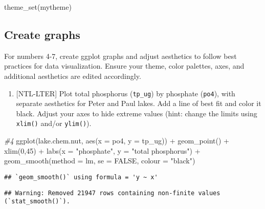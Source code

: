 \documentclass[
]{article}
\newenvironment{Shaded}{\begin{snugshade}}{\end{snugshade}}
\newcommand{\AttributeTok}[1]{\textcolor[rgb]{0.77,0.63,0.00}{#1}}
\newcommand{\CommentTok}[1]{\textcolor[rgb]{0.56,0.35,0.01}{\textit{#1}}}
\newcommand{\ConstantTok}[1]{\textcolor[rgb]{0.00,0.00,0.00}{#1}}
\newcommand{\DecValTok}[1]{\textcolor[rgb]{0.00,0.00,0.81}{#1}}
\newcommand{\FunctionTok}[1]{\textcolor[rgb]{0.00,0.00,0.00}{#1}}
\newcommand{\NormalTok}[1]{#1}
\newcommand{\SpecialCharTok}[1]{\textcolor[rgb]{0.00,0.00,0.00}{#1}}
\newcommand{\StringTok}[1]{\textcolor[rgb]{0.31,0.60,0.02}{#1}}
\providecommand{\tightlist}{%
  \setlength{\itemsep}{0pt}\setlength{\parskip}{0pt}}
\begin{document}
\begin{Shaded}
\begin{Highlighting}[]
\FunctionTok{theme\_set}\NormalTok{(mytheme)}
\end{Highlighting}
\end{Shaded}

\hypertarget{create-graphs}{%
\subsection{Create graphs}\label{create-graphs}}

For numbers 4-7, create ggplot graphs and adjust aesthetics to follow
best practices for data visualization. Ensure your theme, color
palettes, axes, and additional aesthetics are edited accordingly.

\begin{enumerate}
\def\labelenumi{\arabic{enumi}.}
\setcounter{enumi}{3}
\tightlist
\item
  {[}NTL-LTER{]} Plot total phosphorus (\texttt{tp\_ug}) by phosphate
  (\texttt{po4}), with separate aesthetics for Peter and Paul lakes. Add
  a line of best fit and color it black. Adjust your axes to hide
  extreme values (hint: change the limits using \texttt{xlim()} and/or
  \texttt{ylim()}).
\end{enumerate}

\begin{Shaded}
\begin{Highlighting}[]
\CommentTok{\#4 }
\FunctionTok{ggplot}\NormalTok{(lake.chem.nut, }\FunctionTok{aes}\NormalTok{(}\AttributeTok{x =}\NormalTok{ po4, }\AttributeTok{y =}\NormalTok{ tp\_ug)) }\SpecialCharTok{+}
  \FunctionTok{geom\_point}\NormalTok{() }\SpecialCharTok{+}
  \FunctionTok{xlim}\NormalTok{(}\DecValTok{0}\NormalTok{,}\DecValTok{45}\NormalTok{) }\SpecialCharTok{+}
  \FunctionTok{labs}\NormalTok{(}\AttributeTok{x =} \StringTok{"phosphate"}\NormalTok{, }\AttributeTok{y =} \StringTok{"total phosphorus"}\NormalTok{) }\SpecialCharTok{+}
  \FunctionTok{geom\_smooth}\NormalTok{(}\AttributeTok{method =}\NormalTok{ lm, }\AttributeTok{se =} \ConstantTok{FALSE}\NormalTok{, }\AttributeTok{colour =} \StringTok{"black"}\NormalTok{)}
\end{Highlighting}
\end{Shaded}

\begin{verbatim}
## `geom_smooth()` using formula = 'y ~ x'
\end{verbatim}

\begin{verbatim}
## Warning: Removed 21947 rows containing non-finite values (`stat_smooth()`).
\end{verbatim}
\end{document}
